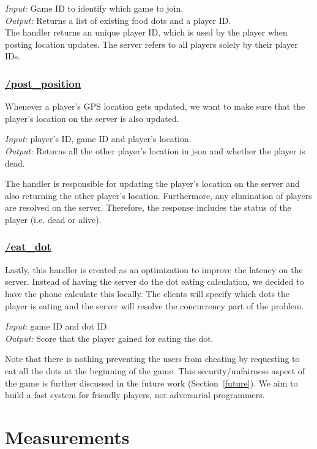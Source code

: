 \documentclass{acm_proc_article-sp}
\begin{document}
\emph{Input:} Game ID to identify which game to join.\\
\emph{Output:} Returns a list of existing food dots and a player ID.\\

The handler returns an unique player ID, which is used by the player
when posting location updates. The server refers to all players solely by
their player IDs.

\subsubsection{\url{/post_position}}
Whenever a player's GPS location gets updated, we want to make sure
that the player's location on the server is also updated.

\emph{Input:} player's ID, game ID and player's location.\\
\emph{Output:} Returns all the other player's location in json and
whether the player is dead.

The handler is responsible for updating the player's location on the
server and also returning the other player's location. Furthermore,
any elimination of players are resolved on the server. Therefore, the
response includes the status of the player (i.e. dead or alive).

\subsubsection{\url{/eat_dot}}
Lastly, this handler is created as an optimization to improve the
latency on the server. Instead of having the server do the dot eating
calculation, we decided to have the phone calculate this locally. The
clients will specify which dots the player is eating and the server
will resolve the concurrency part of the problem.

\emph{Input:} game ID and dot ID.\\
\emph{Output:} Score that the player gained for eating the dot.

Note that there is nothing preventing the users from cheating by
requesting to eat all the dots at the beginning of the game. This
security/unfairness aspect of the game is further discussed in the
future work (Section~\ref{future}). We aim to build a fast system for
friendly players, not adversarial programmers.

\section{Measurements}
\end{document}
